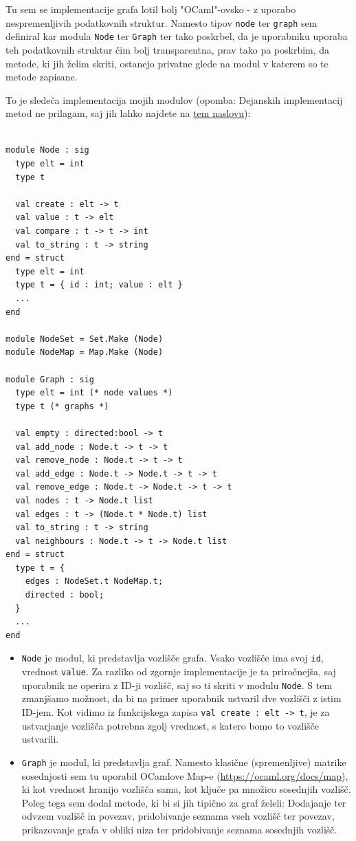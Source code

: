 \documentclass[mat1, tisk]{fmfdelo}
\begin{document}
Tu sem se implementacije grafa lotil bolj "OCaml"-ovsko - z uporabo nespremenljivih podatkovnih struktur. Namesto tipov \texttt{node} ter \texttt{graph}
sem definiral kar modula \texttt{Node} ter \texttt{Graph} ter tako poskrbel, da je uporabniku uporaba teh podatkovnih struktur čim bolj transparentna, prav tako
pa poskrbim, da metode, ki jih želim skriti, ostanejo privatne glede na modul v katerem so te metode zapisane.

To je sledeča implementacija mojih modulov (opomba: Dejanskih implementacij metod ne prilagam, saj jih lahko najdete na 
\href{https://github.com/tjazerzen/parallelisation-of-graph-algorithms-in-functional-programming-languages/blob/master/playground/graph/graph.ml}{tem naslovu}):

\begin{lstlisting}

module Node : sig
  type elt = int
  type t

  val create : elt -> t
  val value : t -> elt
  val compare : t -> t -> int
  val to_string : t -> string
end = struct
  type elt = int
  type t = { id : int; value : elt }
  ...
end

module NodeSet = Set.Make (Node)
module NodeMap = Map.Make (Node)

module Graph : sig
  type elt = int (* node values *)
  type t (* graphs *)

  val empty : directed:bool -> t
  val add_node : Node.t -> t -> t
  val remove_node : Node.t -> t -> t
  val add_edge : Node.t -> Node.t -> t -> t
  val remove_edge : Node.t -> Node.t -> t -> t
  val nodes : t -> Node.t list
  val edges : t -> (Node.t * Node.t) list
  val to_string : t -> string
  val neighbours : Node.t -> t -> Node.t list
end = struct
  type t = {
    edges : NodeSet.t NodeMap.t;
    directed : bool;
  }
  ...
end

\end{lstlisting}

\begin{itemize}
  \item \texttt{Node} je modul, ki predstavlja vozlišče grafa. Vsako vozlišče ima svoj \texttt{id}, vrednost \texttt{value}.
        Za razliko od zgornje implementacije je ta priročnejša, saj uporabnik ne operira z ID-ji vozlišč, saj so ti skriti v modulu \texttt{Node}.
        S tem zmanjšamo možnost, da bi na primer uporabnik ustvaril dve vozlišči z istim ID-jem. Kot vidimo iz funkcijskega zapisa
        \texttt{val create : elt -> t}, je za ustvarjanje vozlišča potrebna zgolj vrednost, s katero bomo to vozlišče ustvarili.
  \item \texttt{Graph} je modul, ki predstavlja graf. Namesto klasične (spremenljive) matrike sosednjosti sem tu uporabil OCamlove
        Map-e (\url{https://ocaml.org/docs/map}), ki kot vrednost hranijo vozlišča sama, kot ključe pa množico sosednjih vozlišč.
        Poleg tega sem dodal metode, ki bi si jih tipično za graf želeli: Dodajanje ter odvzem vozlišč in povezav, pridobivanje seznama vseh vozlišč ter povezav,
        prikazovanje grafa v obliki niza ter pridobivanje seznama sosednjih vozlišč.
\end{itemize}
\end{document}
